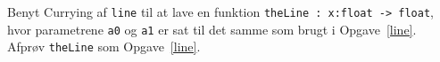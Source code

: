 \label{theLine} Benyt Currying af \lstinline{line} til at lave en funktion \lstinline{theLine : x:float -> float}, hvor parametrene \lstinline{a0} og \lstinline{a1} er sat til det samme som brugt i Opgave~\ref{line}. Afprøv \lstinline{theLine} som Opgave~\ref{line}.
